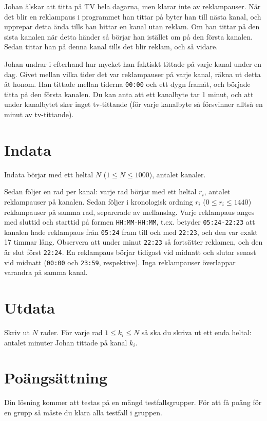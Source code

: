 Johan älskar att titta på TV hela dagarna, men klarar inte av reklampauser. När det blir en reklampaus i programmet
han tittar på byter han till nästa kanal, och upprepar detta ända tills han hittar en kanal utan reklam. Om han tittar på
den sista kanalen när detta händer så börjar han istället om på den första kanalen. Sedan tittar han på denna kanal tills det blir reklam, och så vidare.

Johan undrar i efterhand hur mycket han faktiskt tittade på varje kanal under en dag. Givet mellan vilka tider det var reklampauser på varje kanal,
räkna ut detta åt honom. Han tittade mellan tiderna \texttt{00:00} och ett dygn framåt, och började titta på den första kanalen.
Du kan anta att ett kanalbyte tar 1 minut, och att under kanalbytet sker inget tv-tittande (för varje kanalbyte så försvinner alltså en minut av tv-tittande).

\section*{Indata}
Indata börjar med ett heltal $N$ ($1 \leq N \leq 1000$), antalet kanaler.

Sedan följer en rad per kanal: varje rad börjar med ett heltal $r_i$, antalet reklampauser på kanalen. 
Sedan följer i kronologisk ordning $r_i$ ($0 \leq r_i \leq 1440$) reklampauser på samma rad, separerade av mellanslag.
Varje reklampaus anges med sluttid och starttid på formen \texttt{HH:MM-HH:MM}, t.ex. betyder \texttt{05:24-22:23} att kanalen hade
reklampaus från \texttt{05:24} fram till och med \texttt{22:23}, och den var exakt 17 timmar lång. Observera att under minut \texttt{22:23} så fortsätter reklamen,
och den är slut först \texttt{22:24}. En reklampaus börjar tidigast vid midnatt och slutar senast vid midnatt (\texttt{00:00} och \texttt{23:59}, respektive).
Inga reklampauser överlappar varandra på samma kanal.

\section*{Utdata}
Skriv ut $N$ rader. För varje rad $1 \leq k_i \leq N$ så ska du skriva ut ett enda heltal: antalet minuter Johan tittade på kanal $k_i$.

\section*{Poängsättning}
Din lösning kommer att testas på en mängd testfallsgrupper.
För att få poäng för en grupp så måste du klara alla testfall i gruppen.

